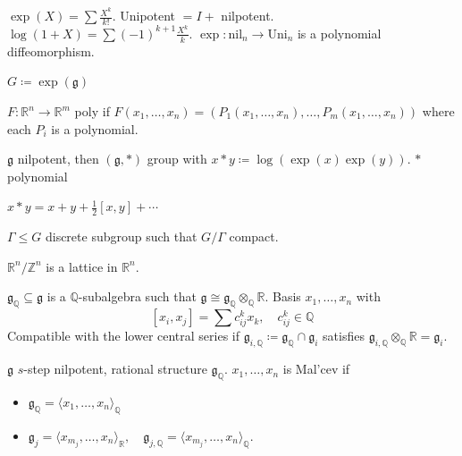 \begin{definition} $\exp (X) = \sum \frac{X^k}{k!}$. Unipotent $= I + $ nilpotent. $\log (1 + X) = \sum (-1)^{k+1} \frac{X^k}{k}$. $\exp : \text{nil}_n \to \text{Uni}_n$ is a polynomial diffeomorphism.
\end{definition}

\begin{definition}
$G \coloneqq \exp(\mathfrak{g})$
\end{definition}

\begin{definition}
$F: \mathbb{R}^n \to \mathbb{R}^m$ poly if $F (x_1, \ldots, x_n ) = (P_1(x_1, \ldots, x_n), \ldots, P_m(x_1, \ldots, x_n))$ where each $P_i$ is a polynomial.
\end{definition}

\begin{definition} $\mathfrak{g}$ nilpotent, then $(\mathfrak{g}, \ast)$ group with $x \ast y \coloneqq \log (\exp (x) \exp (y))$. $\ast$ polynomial
\end{definition}

\begin{theorem} $x \ast y = x + y + \frac{1}{2}[x, y] + \cdots $
\end{theorem}

\begin{definition}[Lattice] $\Gamma \leq G$ discrete subgroup such that $G/\Gamma$ compact.
\end{definition}

\begin{example} $\mathbb{R}^n / \mathbb{Z}^n$ is a lattice in $\mathbb{R}^n$.
\end{example}

\begin{definition} $\mathfrak{g}_{\mathbb{Q}} \subseteq \mathfrak{g}$ is a $\mathbb{Q}$-subalgebra such that $\mathfrak{g} \cong \mathfrak{g}_{\mathbb{Q}} \otimes_{\mathbb{Q}} \mathbb{R}$. Basis $x_1, \ldots, x_n$ with
\[
[x_i, x_j] = \sum c_{ij}^k x_k, \quad  c_{ij}^k \in \mathbb{Q}
\]
Compatible with the lower central series if $\mathfrak{g}_{i, \mathbb{Q}} \coloneqq \mathfrak{g}_{\mathbb{Q}} \cap \mathfrak{g}_i$ satisfies $\mathfrak{g}_{i, \mathbb{Q}} \otimes_{\mathbb{Q}} \mathbb{R} = \mathfrak{g}_i$.
\end{definition}

\begin{definition}
$\mathfrak{g}$ $s$-step nilpotent, rational structure $\mathfrak{g}_{\mathbb{Q}}$. $x_1, \ldots, x_n$ is Mal'cev if
\begin{itemize}[topsep=-6pt, itemsep=0pt]
    \item $\mathfrak{g}_\mathbb{Q} = \langle x_1, \ldots, x_n \rangle_\mathbb{Q}$
    \item $\mathfrak{g}_j = \langle x_{m_{j}}, \ldots, x_n \rangle_\mathbb{R}, \quad \mathfrak{g}_{j, \mathbb{Q}} = \langle x_{m_{j}}, \ldots, x_n \rangle_\mathbb{Q}$.
\end{itemize}
\end{definition}

